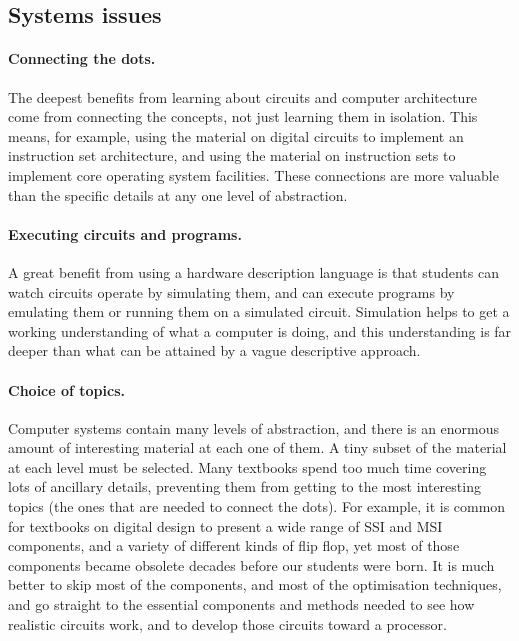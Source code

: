 \documentclass[submission,copyright,creativecommons]{eptcs}
\begin{document}
\subsection{Systems issues}

\paragraph{Connecting the dots.}
The deepest benefits from learning about circuits and computer
architecture come from connecting the concepts, not just learning
them in isolation.  This means, for example, using the material on
digital circuits to implement an instruction set architecture, and
using the material on instruction sets to implement core operating
system facilities.  These connections are more valuable than the
specific details at any one level of abstraction.

\paragraph{Executing circuits and programs.}
A great benefit from using a hardware description language is that
students can watch circuits operate by simulating them, and can
execute programs by emulating them or running them on a simulated
circuit.  Simulation helps to get a working understanding of what a
computer is doing, and this understanding is far deeper than what
can be attained by a vague descriptive approach.

\paragraph{Choice of topics.}
Computer systems contain many levels of abstraction, and there is an
enormous amount of interesting material at each one of them.  A tiny
subset of the material at each level must be selected.  Many textbooks
spend too much time covering lots of ancillary details, preventing
them from getting to the most interesting topics (the ones that are
needed to connect the dots).  For example, it is common for textbooks
on digital design to present a wide range of SSI and MSI components,
and a variety of different kinds of flip flop, yet most of those
components became obsolete decades before our students were born.  It
is much better to skip most of the components, and most of the
optimisation techniques, and go straight to the essential components
and methods needed to see how realistic circuits work, and to develop
those circuits toward a processor.
\end{document}
